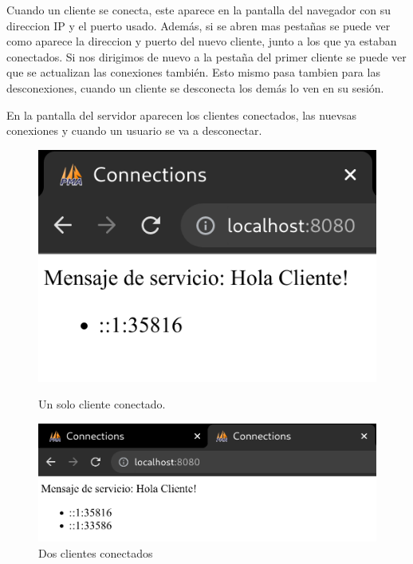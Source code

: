 \documentclass{article}
\begin{document}
Cuando un cliente se conecta, este aparece en la pantalla del navegador con su direccion IP y el puerto usado. Además, si se abren mas pestañas se puede ver como aparece la direccion y puerto del nuevo cliente, junto a los que ya estaban conectados. Si nos dirigimos de nuevo a la pestaña del primer cliente se puede ver que se actualizan las conexiones también. Esto mismo pasa tambien para las desconexiones, cuando un cliente se desconecta los demás lo ven en su sesión.

En la pantalla del servidor aparecen los clientes conectados, las nuevsas conexiones y cuando un usuario se va a desconectar.

\begin{figure}[H]
    \centering
    \begin{minipage}[H]{0.49\textwidth}
        \centering
        \includegraphics[width=\textwidth]{images/connect1.png}
        \caption{Un solo cliente conectado.}
    \end{minipage}
    \hfill
    \begin{minipage}[H]{0.49\textwidth}
        \centering
        \includegraphics[width=\textwidth]{images/connect2.png}
        \caption{Dos clientes conectados}
    \end{minipage}
\end{figure}
\end{document}

